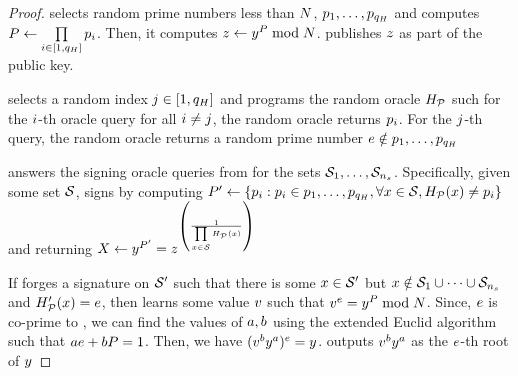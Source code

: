 \begin{proof}
	
	\item \rsaAdversary selects \oracleQueries random prime numbers less than $N$, 
	$\randPrimes[1], \dots, 
	\randPrimes[\oracleQueries]$ and computes $\randPrimeAccSet \gets 
	\prod\limits_{\setIdx \in 
	[1, \oracleQueries]} \randPrimes[\setIdx]$. Then, it computes 	$\simFnOutput \gets 
	\genericFnOutput^{\randPrimeAccSet} \bmod \rsaMod$. \rsaAdversary publishes 
	$z$ as part of the public key. 
	
	\item\rsaAdversary selects a random index $j \in [1, q_H]$ and programs the 
	random oracle $H_{\mathcal{P}}$ such for the $i$-th oracle query for all $i \neq j$, the random 
	oracle returns $\randPrimes[\setIdx]$. For the $j$-th query, the random oracle returns a 
	random prime number $\rsaExponent \notin \randPrimes[1], \dots, 
	\randPrimes[\oracleQueries]$
	
	
	\item \rsaAdversary answers the signing oracle queries from \ufcmaAdversary for the sets 
	$\genericSetVar[1], \dots, \genericSetVar[\numberOfSetsQueried]$. Specifically, given some set 
	$\genericSetVar$, \rsaAdversary signs \genericSetVar by computing $\randPrimeAccSet' \gets \{ \randPrimes[i]:\randPrimes[i] \in \randPrimes[1], \dots, \randPrimes[\oracleQueries],  \forall \genericSetElmt \in \genericSetVar, \primeRO(\genericSetElmt)   \neq \randPrimes[i] \}$ 
and returning $\dhVar[1] \gets \genericFnOutput^{P'} = 
	\simFnOutput^{ \left(\frac{1}{\challengeSetAcc}\right)}$





	
	
	\item  If \ufcmaAdversary forges a signature on $\genericSetVar'$ such that there is some 
	$\genericSetElmt \in \genericSetVar'$ but $\genericSetElmt \notin \genericSetVar[1] \cup \dots  
	\cup \genericSetVar[\numberOfSetsQueried]$ and $\primeRO'(\genericSetElmt) = \rsaExponent$, 
	then  \rsaAdversary learns some value 
	$v$ such that 
	$\genericVal^{\rsaExponent}  = 	
	\genericFnOutput^{\randPrimeAccSet} \bmod \rsaMod$. Since, $e$ is co-prime to 
	\randPrimeAccSet, we can find the values of $\euclideanConst[1], \euclideanConst[2]$ using the 
	extended Euclid algorithm such that 
	$\euclideanConst[1] \rsaExponent + \euclideanConst[2] \randPrimeAccSet = 1$. Then, we have 
	$(\genericVal^{\euclideanConst[2]} \genericFnOutput^{\euclideanConst[1]})^{\rsaExponent} 
	= \genericFnOutput$. \rsaAdversary outputs $\genericVal^{\euclideanConst[2]} 
	\genericFnOutput^{\euclideanConst[1]}$ as the $e$-th root of $\genericFnOutput$ 
	

\end{proof}
